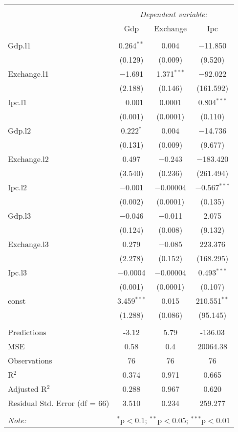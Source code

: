 
\begin{table}[H] \centering 
  \caption{} 
  \label{tb:var3} 
\begin{tabular}{@{\extracolsep{5pt}}lccc} 
\\[-1.8ex]\hline 
\hline \\[-1.8ex] 
 & \multicolumn{3}{c}{\textit{Dependent variable:}} \\ 
\cline{2-4} 
 & Gdp & Exchange & Ipc \\ 
\hline \\[-1.8ex] 
 Gdp.l1 & 0.264$^{**}$ & 0.004 & $-$11.850 \\ 
  & (0.129) & (0.009) & (9.520) \\ 
  Exchange.l1 & $-$1.691 & 1.371$^{***}$ & $-$92.022 \\ 
  & (2.188) & (0.146) & (161.592) \\ 
  Ipc.l1 & $-$0.001 & 0.0001 & 0.804$^{***}$ \\ 
  & (0.001) & (0.0001) & (0.110) \\ 
  Gdp.l2 & 0.222$^{*}$ & 0.004 & $-$14.736 \\ 
  & (0.131) & (0.009) & (9.677) \\ 
  Exchange.l2 & 0.497 & $-$0.243 & $-$183.420 \\ 
  & (3.540) & (0.236) & (261.494) \\ 
  Ipc.l2 & $-$0.001 & $-$0.00004 & $-$0.567$^{***}$ \\ 
  & (0.002) & (0.0001) & (0.135) \\ 
  Gdp.l3 & $-$0.046 & $-$0.011 & 2.075 \\ 
  & (0.124) & (0.008) & (9.132) \\ 
  Exchange.l3 & 0.279 & $-$0.085 & 223.376 \\ 
  & (2.278) & (0.152) & (168.295) \\ 
  Ipc.l3 & $-$0.0004 & $-$0.00004 & 0.493$^{***}$ \\ 
  & (0.001) & (0.0001) & (0.107) \\ 
  const & 3.459$^{***}$ & 0.015 & 210.551$^{**}$ \\ 
  & (1.288) & (0.086) & (95.145) \\ 
 \hline \\[-1.8ex] 
Predictions & -3.12 & 5.79 & -136.03 \\ 
MSE & 0.58 & 0.4 & 20064.38 \\ 
Observations & 76 & 76 & 76 \\ 
R$^{2}$ & 0.374 & 0.971 & 0.665 \\ 
Adjusted R$^{2}$ & 0.288 & 0.967 & 0.620 \\ 
Residual Std. Error (df = 66) & 3.510 & 0.234 & 259.277 \\ 
\hline 
\hline \\[-1.8ex] 
\textit{Note:}  & \multicolumn{3}{r}{$^{*}$p$<$0.1; $^{**}$p$<$0.05; $^{***}$p$<$0.01} \\ 
\end{tabular} 
\end{table} 
